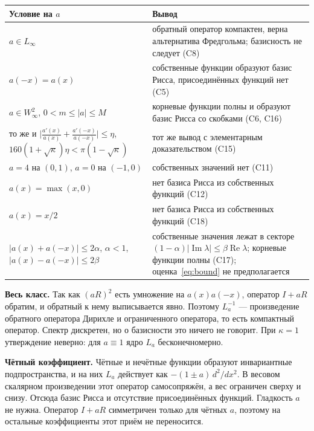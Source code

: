 \documentclass[12pt,a4paper]{article}
\begin{document}
\begin{center}
\renewcommand{\arraystretch}{1.35}
\begin{tabular}{|>{\raggedright\arraybackslash}p{}|>{\raggedright\arraybackslash}p{}|}
\hline
\textbf{Условие на $a$} & \textbf{Вывод}\\\hline
$a\in L_\infty$ & обратный оператор компактен, верна альтернатива Фредгольма; базисность
не следует (C8)\\\hline
$a(-x)=a(x)$ & собственные функции образуют базис Рисса, присоединённых функций
нет (C5)\\\hline
$a\in W^2_\infty$, $0<m\le|a|\le M$ & корневые функции полны и образуют базис Рисса со
скобками (C6, C16)\\\hline
то же и $\bigl|\frac{a'(x)}{a(x)}+\frac{a'(-x)}{a(-x)}\bigr|\le\eta$,
$160(1+\sqrt\kappa)\eta<\pi(1-\sqrt\kappa)$ & тот же вывод с элементарным
доказательством (C15)\\\hline
$a=4$ на $(0,1)$, $a=0$ на $(-1,0)$ & собственных значений нет (C11)\\\hline
$a(x)=\max(x,0)$ & нет базиса Рисса из собственных функций (C12)\\\hline
$a(x)=x/2$ & нет базиса Рисса из собственных функций (C18)\\\hline
$|a(x)+a(-x)|\le2\alpha$, $\alpha<1$, $|a(x)-a(-x)|\le2\beta$ & собственные значения лежат
в секторе $(1-\alpha)|\operatorname{Im}\lambda|\le\beta\operatorname{Re}\lambda$; корневые
функции полны (C17); оценка~\eqref{eq:bound} не предполагается\\\hline
\end{tabular}
\end{center}

\textbf{Весь класс.} Так как $(aR)^2$ есть умножение на $a(x)a(-x)$, оператор $I+aR$
обратим, и обратный к нему выписывается явно. Поэтому $L_a^{-1}$ --- произведение
обратного оператора Дирихле и ограниченного оператора, то есть компактный оператор.
Спектр дискретен, но о базисности это ничего не говорит. При $\kappa=1$ утверждение
неверно: для $a\equiv1$ ядро $L_a$ бесконечномерно.

\textbf{Чётный коэффициент.} Чётные и нечётные функции образуют инвариантные
подпространства, и на них $L_a$ действует как $-(1\pm a)\,d^2/dx^2$. В весовом скалярном
произведении этот оператор самосопряжён, а вес ограничен сверху и снизу. Отсюда базис
Рисса и отсутствие присоединённых функций. Гладкость $a$ не нужна. Оператор $I+aR$
симметричен только для чётных $a$, поэтому на остальные коэффициенты этот приём не
переносится.
\end{document}
